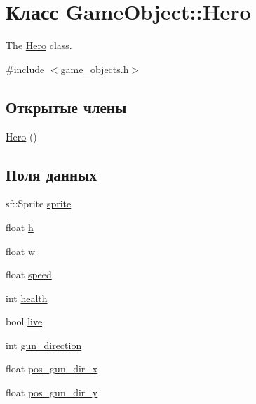 \hypertarget{classGameObject_1_1Hero}{}\section{Класс Game\+Object\+:\+:Hero}
\label{classGameObject_1_1Hero}


The \hyperlink{classGameObject_1_1Hero}{Hero} class.  




{\ttfamily \#include $<$game\+\_\+objects.\+h$>$}

\subsection*{Открытые члены}
\begin{DoxyCompactItemize}
\item 
\hyperlink{classGameObject_1_1Hero_a4489910b28781db349f14ec1c84c0861}{Hero} ()
\end{DoxyCompactItemize}
\subsection*{Поля данных}
\begin{DoxyCompactItemize}
\item 
sf\+::\+Sprite \hyperlink{classGameObject_1_1Hero_aba95da2b9327e20c6031c4159d7ca017}{sprite}
\item 
float \hyperlink{classGameObject_1_1Hero_a19fdfb7b36ab53173913698cc14feae0}{h}
\item 
float \hyperlink{classGameObject_1_1Hero_ac735e21149b7b6e405e21e103a058f27}{w}
\item 
float \hyperlink{classGameObject_1_1Hero_ab9aa6c935fe527672dbda1a9c026aecd}{speed}
\item 
int \hyperlink{classGameObject_1_1Hero_a536db911ab73df15c716ed808f453f10}{health}
\item 
bool \hyperlink{classGameObject_1_1Hero_af61f8b4ea25b9b12bebfd444bc125799}{live}
\item 
int \hyperlink{classGameObject_1_1Hero_a3c46e9c476100f2d29d22bdf6364a303}{gun\+\_\+direction}
\item 
float \hyperlink{classGameObject_1_1Hero_a4a085321b5cffd9dc388503ee1deafb7}{pos\+\_\+gun\+\_\+dir\+\_\+x}
\item 
float \hyperlink{classGameObject_1_1Hero_af6fd4f63cfa0f1177e1ffa1cfae8881d}{pos\+\_\+gun\+\_\+dir\+\_\+y}
\end{DoxyCompactItemize}


